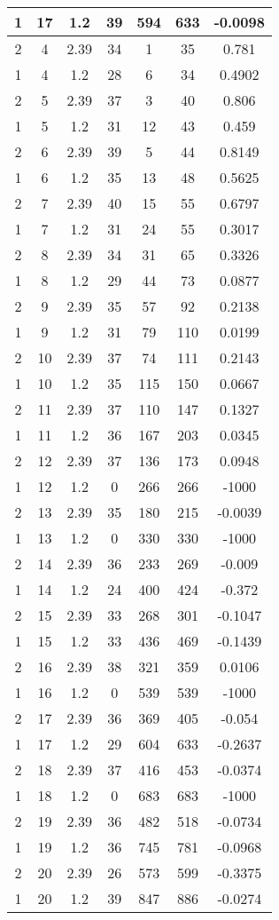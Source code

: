 \documentclass[letterpaper, 12pt]{article}
\begin{document}
\begin{longtable}{|c|c|c|c|c|c|c|}
\hline
1 & 17 & 1.2 & 39 & 594 & 633 & -0.0098 \\
\hline
2 & 4 & 2.39 & 34 & 1 & 35 & 0.781 \\
\hline
1 & 4 & 1.2 & 28 & 6 & 34 & 0.4902 \\
\hline
2 & 5 & 2.39 & 37 & 3 & 40 & 0.806 \\
\hline
1 & 5 & 1.2 & 31 & 12 & 43 & 0.459 \\
\hline
2 & 6 & 2.39 & 39 & 5 & 44 & 0.8149 \\
\hline
1 & 6 & 1.2 & 35 & 13 & 48 & 0.5625 \\
\hline
2 & 7 & 2.39 & 40 & 15 & 55 & 0.6797 \\
\hline
1 & 7 & 1.2 & 31 & 24 & 55 & 0.3017 \\
\hline
2 & 8 & 2.39 & 34 & 31 & 65 & 0.3326 \\
\hline
1 & 8 & 1.2 & 29 & 44 & 73 & 0.0877 \\
\hline
2 & 9 & 2.39 & 35 & 57 & 92 & 0.2138 \\
\hline
1 & 9 & 1.2 & 31 & 79 & 110 & 0.0199 \\
\hline
2 & 10 & 2.39 & 37 & 74 & 111 & 0.2143 \\
\hline
1 & 10 & 1.2 & 35 & 115 & 150 & 0.0667 \\
\hline
2 & 11 & 2.39 & 37 & 110 & 147 & 0.1327 \\
\hline
1 & 11 & 1.2 & 36 & 167 & 203 & 0.0345 \\
\hline
2 & 12 & 2.39 & 37 & 136 & 173 & 0.0948 \\
\hline
1 & 12 & 1.2 & 0 & 266 & 266 & -1000 \\
\hline
2 & 13 & 2.39 & 35 & 180 & 215 & -0.0039 \\
\hline
1 & 13 & 1.2 & 0 & 330 & 330 & -1000 \\
\hline
2 & 14 & 2.39 & 36 & 233 & 269 & -0.009 \\
\hline
1 & 14 & 1.2 & 24 & 400 & 424 & -0.372 \\
\hline
2 & 15 & 2.39 & 33 & 268 & 301 & -0.1047 \\
\hline
1 & 15 & 1.2 & 33 & 436 & 469 & -0.1439 \\
\hline
2 & 16 & 2.39 & 38 & 321 & 359 & 0.0106 \\
\hline
1 & 16 & 1.2 & 0 & 539 & 539 & -1000 \\
\hline
2 & 17 & 2.39 & 36 & 369 & 405 & -0.054 \\
\hline
1 & 17 & 1.2 & 29 & 604 & 633 & -0.2637 \\
\hline
2 & 18 & 2.39 & 37 & 416 & 453 & -0.0374 \\
\hline
1 & 18 & 1.2 & 0 & 683 & 683 & -1000 \\
\hline
2 & 19 & 2.39 & 36 & 482 & 518 & -0.0734 \\
\hline
1 & 19 & 1.2 & 36 & 745 & 781 & -0.0968 \\
\hline
2 & 20 & 2.39 & 26 & 573 & 599 & -0.3375 \\
\hline
1 & 20 & 1.2 & 39 & 847 & 886 & -0.0274 \\
\hline
\end{longtable}
\end{document}
